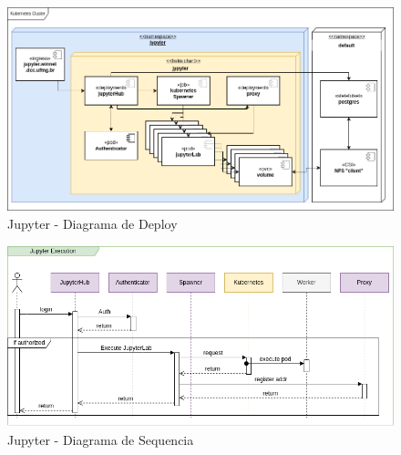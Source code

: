 \documentclass[10pt,brazil]{beamer}
\theoremstyle{definition}
\begin{document}
\begin{frame}[plain]
  \hspace*{-10mm}
  \begin{figure}
    \centering  
  \includegraphics[width=0.85\paperwidth]{tcc_jupyter_deploy.png}
      \caption[Jupyter Deploy]{Jupyter - Diagrama de Deploy}
  \end{figure}  
\end{frame}

\begin{frame}[plain]
  \hspace*{-10mm}
    \begin{figure}
    \centering  
  \includegraphics[width=.85\paperwidth]{jupyter_sequence.png}
      \caption[Jupyter - Diagrama de Sequencia]{Jupyter - Diagrama de Sequencia}
  \end{figure}  
\end{frame}
\end{document}
